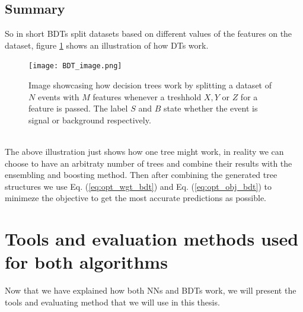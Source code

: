 \documentclass[12pt, a4paper]{book}
\begin{document}
\subsection{Summary}
So in short BDTs split datasets based on different values of the features on the dataset, figure \ref{fig:DT_ilus} shows an illustration of how DTs work.
\graphicspath{{../../figures/}}
\begin{figure}[!ht]
	\centering
    \texttt{[image: BDT\_image.png]}
    \caption[Basic Decision Tree illustration]{Image showcasing how decision trees work by splitting a dataset of $N$ events with $M$ features whenever a treshhold $X, Y$ or $Z$ for a feature is passed. The label $S$ and $B$ state whether the event is signal or background respectively.}\label{fig:DT_ilus}
\end{figure}
\\The above illustration just shows how one tree might work, in reality we can choose to have an arbitraty number of trees and combine their results with the ensembling and boosting method. Then after combining the generated tree structures we use Eq. (\ref{eq:opt_wgt_bdt}) and Eq. (\ref{eq:opt_obj_bdt}) 
to minimeze the objective to get the most accurate predictions as possible. 

\clearpage
\section{Tools and evaluation methods used for both algorithms}
Now that we have explained how both NNs and BDTs work, we will present the tools and evaluating method that we will use in this thesis. 
\end{document}
